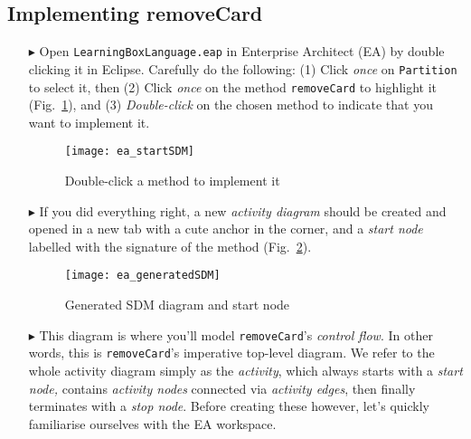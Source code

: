 \newpage
\hypertarget{remCard vis}{}
\subsection{Implementing removeCard}
\visHeader

\begin{itemize}

\item[$\blacktriangleright$] Open \texttt{LearningBoxLanguage.eap} in Enterprise Architect (EA) by dou\-ble clicking it in Eclipse. Carefully do the
following: (1) Click \emph{once} on \texttt{Partition} to select it, then (2) Click \emph{once} on the method \texttt{removeCard} to highlight it
(Fig.~\ref{fig:sdm_start}), and (3) \emph{Double-click} on the chosen method to indicate that you want to implement it.

\begin{figure}[htp]
\begin{center}
  \texttt{[image: ea\_startSDM]}
  \caption{Double-click a method to implement it}  
  \label{fig:sdm_start}
\end{center}
\end{figure}
 
\item[$\blacktriangleright$] If you did everything right, a new \emph{activity diagram} should be created and opened in a new tab with a cute anchor in
the corner, and a \emph{start node} labelled with the signature of the method (Fig.~\ref{fig:sdm_skeleton}).  

\begin{figure}[htp]
\begin{center}
 \texttt{[image: ea\_generatedSDM]}
  \caption{Generated SDM diagram and start node}  
  \label{fig:sdm_skeleton}
\end{center}
\end{figure}

\vspace{0.5cm}

\item[$\blacktriangleright$] This diagram is where you'll model \texttt{removeCard}'s \emph{control flow}. In other words,
this is \texttt{removeCard}'s imperative top-level diagram. We refer to the whole activity diagram simply as the \emph{activity}, which always starts with a
\emph{start node,} contains \emph{activity nodes} connected via \emph{activity edges}, then finally terminates with a \emph{stop node}. Before creating
these however, let's quickly familiarise ourselves with the EA workspace.


\end{itemize}
